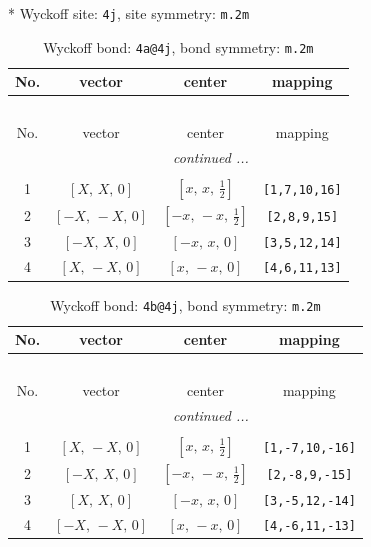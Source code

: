 \documentclass[fleqn,8pt]{jsarticle}
\begin{document}
* Wyckoff site: {\tt 4j}, site symmetry: {\tt m.2m}
\renewcommand{\arraystretch}{1.2}
\begin{longtable}{cccc}
\caption{Wyckoff bond: {\tt 4a@4j}, bond symmetry: {\tt m.2m}}
 \\
 \hline \hline
No. & vector & center & mapping \\ \hline \endfirsthead

\multicolumn{3}{l}{\tablename\ \thetable{}} \\
 \hline \hline
No. & vector & center & mapping \\ \hline \endhead

 \hline \hline
\multicolumn{3}{r}{\footnotesize\it continued ...} \\ \endfoot

 \hline \hline
\multicolumn{3}{r}{} \\ \endlastfoot

1 & $\left[ X,\, X,\, 0 \right]$ & $\left[ x,\, x,\, \frac{1}{2} \right]$ & {\tt [1,7,10,16]} \\ \hline
2 & $\left[ - X,\, - X,\, 0 \right]$ & $\left[ - x,\, - x,\, \frac{1}{2} \right]$ & {\tt [2,8,9,15]} \\ \hline
3 & $\left[ - X,\, X,\, 0 \right]$ & $\left[ - x,\, x,\, 0 \right]$ & {\tt [3,5,12,14]} \\ \hline
4 & $\left[ X,\, - X,\, 0 \right]$ & $\left[ x,\, - x,\, 0 \right]$ & {\tt [4,6,11,13]} \\
\end{longtable}
\renewcommand{\arraystretch}{1.2}
\begin{longtable}{cccc}
\caption{Wyckoff bond: {\tt 4b@4j}, bond symmetry: {\tt m.2m}}
 \\
 \hline \hline
No. & vector & center & mapping \\ \hline \endfirsthead

\multicolumn{3}{l}{\tablename\ \thetable{}} \\
 \hline \hline
No. & vector & center & mapping \\ \hline \endhead

 \hline \hline
\multicolumn{3}{r}{\footnotesize\it continued ...} \\ \endfoot

 \hline \hline
\multicolumn{3}{r}{} \\ \endlastfoot

1 & $\left[ X,\, - X,\, 0 \right]$ & $\left[ x,\, x,\, \frac{1}{2} \right]$ & {\tt [1,-7,10,-16]} \\ \hline
2 & $\left[ - X,\, X,\, 0 \right]$ & $\left[ - x,\, - x,\, \frac{1}{2} \right]$ & {\tt [2,-8,9,-15]} \\ \hline
3 & $\left[ X,\, X,\, 0 \right]$ & $\left[ - x,\, x,\, 0 \right]$ & {\tt [3,-5,12,-14]} \\ \hline
4 & $\left[ - X,\, - X,\, 0 \right]$ & $\left[ x,\, - x,\, 0 \right]$ & {\tt [4,-6,11,-13]} \\
\end{longtable}
\end{document}
